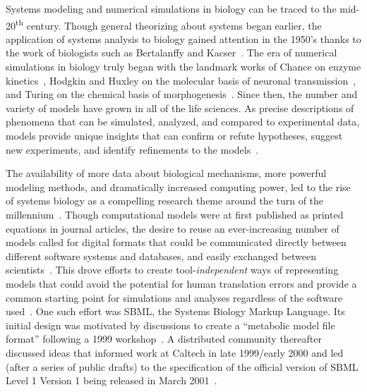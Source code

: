\documentclass{sbml-paper}
\begin{document}
Systems modeling and numerical simulations in biology can be traced to the mid-20\textsuperscript{th} century. Though general theorizing about systems began earlier, the application of systems analysis to biology gained attention in the 1950's thanks to the work of biologists such as Bertalanffy and Kacser~\citep{Von_Bertalanffy1950-dy, Von_Bertalanffy1950-wa, Kacser1957-ox}. The era of numerical simulations in biology truly began with the landmark works of Chance on enzyme kinetics~\citep{chance1952mechanism, chance1940kinetics}, Hodgkin and Huxley on the molecular basis of neuronal transmission~\citep{hodgkin1952quantitative}, and Turing on the chemical basis of morphogenesis~\citep{turing1990chemical}. Since then, the number and variety of models have grown in all of the life sciences. As precise descriptions of phenomena that can be simulated, analyzed, and compared to experimental data, models provide unique insights that can confirm or refute hypotheses, suggest new experiments, and identify refinements to the models~\citep{Heinrich1996, le_novere_2015}.

The availability of more data about biological mechanisms, more powerful modeling methods, and dramatically increased computing power, led to the rise of systems biology as a compelling research theme around the turn of the millennium~\citep{kitano2000perspectives, ideker2001new}. Though computational models were at first published as printed equations in journal articles, the desire to reuse an ever-increasing number of models called for digital formats that could be communicated directly between different software systems and databases, and easily exchanged between scientists~\citep[topics of interest as early as the 1960's; c.f.][]{Garfinkel1969construction}. This drove efforts to create tool-\emph{independent} ways of representing models that could avoid the potential for human translation errors and provide a common starting point for simulations and analyses regardless of the software used~\citep{Lloyd2004-fd, Goddard2001-ix, hucka_2001}. One such effort was SBML, the Systems Biology Markup Language. Its initial design was motivated by discussions to create a ``metabolic model file format'' following a 1999 workshop~\citep{Cornish-Bowden2000technological}. A distributed community thereafter discussed ideas that informed work at Caltech in late 1999/early 2000 and led (after a series of public drafts) to the specification of the official version of SBML Level 1 Version 1 being released in March 2001~\citep{hucka_2003}.
\end{document}
